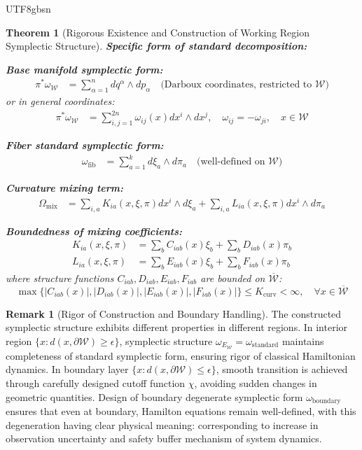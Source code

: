 \documentclass[a4paper,12pt]{extarticle}
\newtheorem{theorem}{Theorem}
\theoremstyle{definition}
\newtheorem{remark}{Remark}
\begin{document}
\begin{CJK}{UTF8}{gbsn}
\begin{theorem}[Rigorous Existence and Construction of Working Region Symplectic Structure]
\textbf{Specific form of standard decomposition:}

\textbf{Base manifold symplectic form:}
\begin{align*}
\pi^*\omega_{\mathcal{W}} &= \sum_{\alpha=1}^n dq^\alpha \wedge dp_\alpha \quad \text{(Darboux coordinates, restricted to $\mathcal{W}$)}
\end{align*}
or in general coordinates:
\begin{align*}
\pi^*\omega_{\mathcal{W}} &= \sum_{i,j=1}^{2n} \omega_{ij}(x) dx^i \wedge dx^j, \quad \omega_{ij} = -\omega_{ji}, \quad x \in \mathcal{W}
\end{align*}

\textbf{Fiber standard symplectic form:}
\begin{align*}
\omega_{\text{fib}} &= \sum_{a=1}^k d\xi_a \wedge d\pi_a \quad \text{(well-defined on $\mathcal{W}$)}
\end{align*}

\textbf{Curvature mixing term:}
\begin{align*}
\Omega_{\text{mix}} &= \sum_{i,a} K_{ia}(x,\xi,\pi) dx^i \wedge d\xi_a + \sum_{i,a} L_{ia}(x,\xi,\pi) dx^i \wedge d\pi_a
\end{align*}

\textbf{Boundedness of mixing coefficients:}
\begin{align*}
K_{ia}(x,\xi,\pi) &= \sum_b C_{iab}(x)\xi_b + \sum_b D_{iab}(x)\pi_b\\
L_{ia}(x,\xi,\pi) &= \sum_b E_{iab}(x)\xi_b + \sum_b F_{iab}(x)\pi_b
\end{align*}
where structure functions $C_{iab}, D_{iab}, E_{iab}, F_{iab}$ are bounded on $\overline{\mathcal{W}}$:
$$\max\{|C_{iab}(x)|, |D_{iab}(x)|, |E_{iab}(x)|, |F_{iab}(x)|\} \leq K_{\text{curv}} < \infty, \quad \forall x \in \overline{\mathcal{W}}$$

\end{theorem}
\begin{remark}[Rigor of Construction and Boundary Handling]
The constructed symplectic structure exhibits different properties in different regions. In interior region $\{x : d(x,\partial \mathcal{W}) \geq \epsilon\}$, symplectic structure $\omega_{E_{\mathcal{W}}} = \omega_{\text{standard}}$ maintains completeness of standard symplectic form, ensuring rigor of classical Hamiltonian dynamics. In boundary layer $\{x : d(x,\partial \mathcal{W}) \leq \epsilon\}$, smooth transition is achieved through carefully designed cutoff function $\chi$, avoiding sudden changes in geometric quantities. Design of boundary degenerate symplectic form $\omega_{\text{boundary}}$ ensures that even at boundary, Hamilton equations remain well-defined, with this degeneration having clear physical meaning: corresponding to increase in observation uncertainty and safety buffer mechanism of system dynamics.
\end{remark}


\end{CJK}
\end{document}

